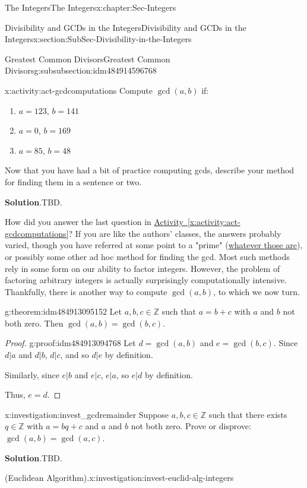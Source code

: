 \documentclass[oneside,10pt,]{book}
\newcommand{\blocktitlefont}{\relax}
\newcommand{\xreffont}{\relax}
\numberwithin{equation}{section}
\def\Z{{\mathbb Z}}
\begin{document}
\begin{chapterptx}{The Integers}{}{The Integers}{}{}{x:chapter:Sec-Integers}
\begin{sectionptx}{Divisibility and GCDs in the Integers}{}{Divisibility and GCDs in the Integers}{}{}{x:section:SubSec-Divisibility-in-the-Integers}
\begin{subsubsectionptx}{Greatest Common Divisors}{}{Greatest Common Divisors}{}{}{g:subsubsection:idm484914596768}
\begin{activity}{}{x:activity:act-gcdcomputations}%
Compute \(\gcd(a,b)\) if:%
\begin{enumerate}
\item{}\(a = 123\), \(b = 141\)%
\item{}\(a = 0\), \(b = 169\)%
\item{}\(a= 85\), \(b = 48\)%
\end{enumerate}
Now that you have had a bit of practice computing gcds, describe your method for finding them in a sentence or two.%
\par\smallskip%
\noindent\textbf{\blocktitlefont Solution}.\hypertarget{g:solution:idm484913041504}{}\quad{}TBD.%
\end{activity}
How did you answer the last question in \hyperref[x:activity:act-gcdcomputations]{Activity~{\xreffont\ref{x:activity:act-gcdcomputations}}}? If you are like the authors' classes, the answers probably varied, though you have referred at some point to a "prime" (\hyperref[x:definition:def-primeinteger]{whatever those are}), or possibly some other ad hoc method for finding the gcd. Most such methods rely in some form on our ability to factor integers. However, the problem of factoring arbitrary integers is actually surprisingly computationally intensive. Thankfully, there is another way to compute \(\gcd(a,b)\), to which we now turn.%
\begin{theorem}{}{}{g:theorem:idm484913095152}%
Let \(a,b,c\in\Z\) such that \(a = b+c\) with \(a\) and \(b\) not both zero. Then \(\gcd(a,b) = \gcd(b,c)\).%
\end{theorem}
\begin{proof}{}{g:proof:idm484913094768}
Let \(d = \gcd(a,b)\) and \(e = \gcd(b,c)\). Since \(d|a\) and \(d|b\), \(d|c\), and so \(d|e\) by definition.%
\par
Similarly, since \(e|b\) and \(e|c\), \(e|a\), so \(e|d\) by definition.%
\par
Thus, \(e = d\).%
\end{proof}
\begin{investigation}{}{x:investigation:invest_gcdremainder}%
Suppose \(a,b,c\in\Z\) such that there exists \(q\in\Z\) with \(a = bq + c\) and \(a\) and \(b\) not both zero. Prove or disprove: \(\gcd(a,b)=\gcd(a,c)\).%
\par\smallskip%
\noindent\textbf{\blocktitlefont Solution}.\hypertarget{g:solution:idm484913110224}{}\quad{}TBD.\end{investigation}
\begin{investigation}{(Euclidean Algorithm).}{x:investigation:invest-euclid-alg-integers}%

\end{investigation}
\end{subsubsectionptx}
\end{sectionptx}
\end{chapterptx}
\end{document}
